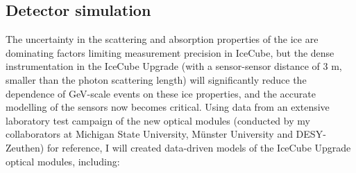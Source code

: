 \documentclass[a4paper,11pt]{article}
\begin{document}


\subsection{Detector simulation}

The uncertainty in the scattering and absorption properties of the ice are dominating factors limiting measurement precision in IceCube, but the dense instrumentation in the IceCube Upgrade (with a sensor-sensor distance of 3 m, smaller than the photon scattering length) will significantly reduce the dependence of GeV-scale events on these ice properties, and the accurate modelling of the sensors now becomes critical. Using data from an extensive laboratory test campaign of the new optical modules (conducted by my collaborators at Michigan State University, M{\"u}nster University and DESY-Zeuthen) for reference, I will created data-driven models of the IceCube Upgrade optical modules, including:
\end{document}
